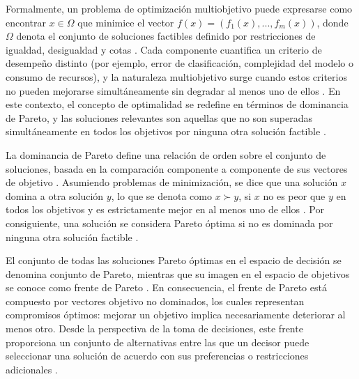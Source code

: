 Formalmente, un problema de optimización multiobjetivo puede expresarse como encontrar $x\in \Omega$ que minimice el vector $f(x)=(f_1(x),...,f_m(x))$, donde $\Omega$ denota el conjunto de soluciones factibles definido por restricciones de igualdad, desigualdad y cotas \cite{MathWorksMultiobjectiveOptimization}. Cada componente cuantifica un criterio de desempeño distinto (por ejemplo, error de clasificación, complejidad del modelo o consumo de recursos), y la naturaleza multiobjetivo surge cuando estos criterios no pueden mejorarse simultáneamente sin degradar al menos uno de ellos \cite{Narayan2019optimization}. En este contexto, el concepto de optimalidad se redefine en términos de dominancia de Pareto, y las soluciones relevantes son aquellas que no son superadas simultáneamente en todos los objetivos por ninguna otra solución factible \cite{Narayan2019optimization}.

La dominancia de Pareto define una relación de orden sobre el conjunto de soluciones, basada en la comparación componente a componente de sus vectores de objetivo \cite{Deb2011MOEAintro}. Asumiendo problemas de minimización, se dice que una solución \(x\) domina a otra solución \(y\), lo que se denota como \(x \succ y\), si \(x\) no es peor que \(y\) en todos los objetivos y es estrictamente mejor en al menos uno de ellos \cite{Deb2011MOEAintro}. Por consiguiente, una solución se considera Pareto óptima si no es dominada por ninguna otra solución factible \cite{Deb2011MOEAintro}.

El conjunto de todas las soluciones Pareto óptimas en el espacio de decisión se denomina conjunto de Pareto, mientras que su imagen en el espacio de objetivos se conoce como frente de Pareto \cite{Deb2011MOEAintro}. En consecuencia, el frente de Pareto está compuesto por vectores objetivo no dominados, los cuales representan compromisos óptimos: mejorar un objetivo implica necesariamente deteriorar al menos otro. Desde la perspectiva de la toma de decisiones, este frente proporciona un conjunto de alternativas entre las que un decisor puede seleccionar una solución de acuerdo con sus preferencias o restricciones adicionales \cite{MathWorksMultiobjectiveOptimization, Narayan2019optimization}.

